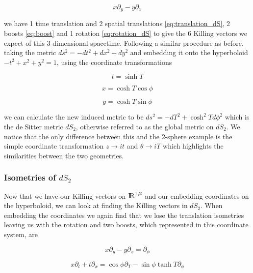 \documentclass[a4paper,11pt]{article}
\numberwithin{equation}{section}
\numberwithin{figure}{section}
\begin{document}
\begin{large}
\begin{equation}
\label{eq:rotation_dS}
    x\partial_y-y\partial_x 
\end{equation}

we have 1 time translation and 2 spatial translations \eqref{eq:translation_dS}, 2 boosts \eqref{eq:boost} and 1 rotation \eqref{eq:rotation_dS} to give the 6 Killing vectors we expect of this 3 dimensional spacetime. Following a similar procedure as before, taking the metric $ds^2=-dt^2+dx^2+dy^2$ and embedding it onto the hyperboloid $-t^2+x^2+y^2=1$, using the coordinate transformations

\begin{equation}
\label{eq:t_hyp}
    t=\sinh T 
\end{equation}

\begin{equation}
\label{eq:x_hyp}
    x=\cosh T\cos\phi
\end{equation}

\begin{equation}
\label{eq:y_hyp}
    y=\cosh T\sin\phi
\end{equation}

we can calculate the new induced metric to be $ds^2=-dT^2+\cosh^2T d\phi^2$ which is the de Sitter metric $dS_2$, otherwise referred to as the global metric on $dS_2$. We notice that the only difference between this and the 2-sphere example is the simple coordinate transformation $z \rightarrow it$ and $\theta \rightarrow iT$ which highlights the similarities between the two geometries.

\subsubsection{Isometries of $dS_2$}

Now that we have our Killing vectors on ${\rm I\!R}^{1,2}$ and our embedding coordinates on the hyperboloid, we can look at finding the Killing vectors in $dS_2$. When embedding the coordinates we again find that we lose the translation isometries leaving us with the rotation and two boosts, which represented in this coordinate system, are


\begin{equation}
\label{eq:xyrot_dS}
x\partial_y-y\partial_x=\partial_\phi
\end{equation}


\begin{equation}
\label{eq:xboost}
x\partial_t+t\partial_x=\cos\phi \partial_T-\sin\phi\tanh T \partial_\phi
\end{equation}



\end{large}
\end{document}
